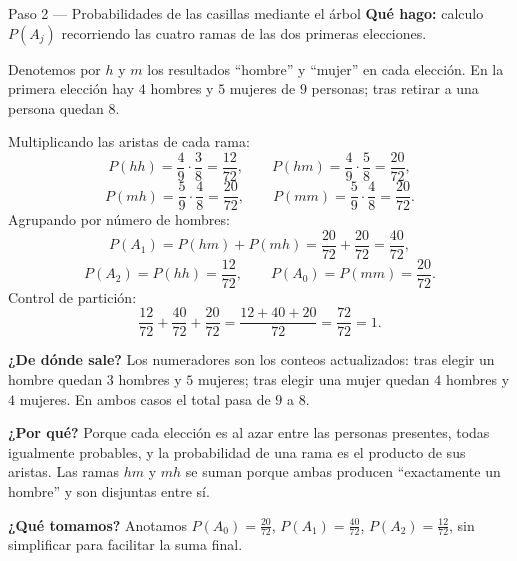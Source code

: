 \documentclass[11pt]{article}
\begin{document}
\begin{paso}{Paso 2 --- Probabilidades de las casillas mediante el árbol}
\textbf{Qué hago:} calculo $P(A_j)$ recorriendo las cuatro ramas de las dos primeras elecciones.

Denotemos por $h$ y $m$ los resultados ``hombre'' y ``mujer'' en cada elección. En la primera elección hay $4$ hombres y $5$ mujeres de $9$ personas; tras retirar a una persona quedan $8$.

\begin{center}
\end{center}

Multiplicando las aristas de cada rama:
\[
P(hh)=\frac{4}{9}\cdot\frac{3}{8}=\frac{12}{72},
\qquad
P(hm)=\frac{4}{9}\cdot\frac{5}{8}=\frac{20}{72},
\]
\[
P(mh)=\frac{5}{9}\cdot\frac{4}{8}=\frac{20}{72},
\qquad
P(mm)=\frac{5}{9}\cdot\frac{4}{8}=\frac{20}{72}.
\]
Agrupando por número de hombres:
\[
P(A_1)=P(hm)+P(mh)=\frac{20}{72}+\frac{20}{72}=\frac{40}{72},
\]
\[
P(A_2)=P(hh)=\frac{12}{72},
\qquad
P(A_0)=P(mm)=\frac{20}{72}.
\]
Control de partición:
\[
\frac{12}{72}+\frac{40}{72}+\frac{20}{72}=\frac{12+40+20}{72}=\frac{72}{72}=1 .
\]

\textbf{¿De dónde sale?} Los numeradores son los conteos actualizados: tras elegir un hombre quedan $3$ hombres y $5$ mujeres; tras elegir una mujer quedan $4$ hombres y $4$ mujeres. En ambos casos el total pasa de $9$ a $8$.

\textbf{¿Por qué?} Porque cada elección es al azar entre las personas presentes, todas igualmente probables, y la probabilidad de una rama es el producto de sus aristas. Las ramas $hm$ y $mh$ se suman porque ambas producen ``exactamente un hombre'' y son disjuntas entre sí.

\textbf{¿Qué tomamos?} Anotamos $P(A_0)=\tfrac{20}{72}$, $P(A_1)=\tfrac{40}{72}$, $P(A_2)=\tfrac{12}{72}$, sin simplificar para facilitar la suma final.
\end{paso}
\end{document}
